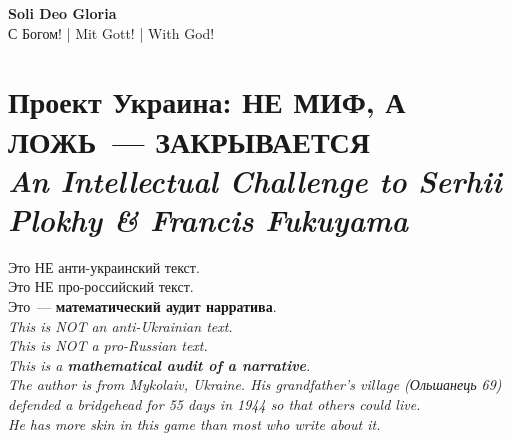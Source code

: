 \documentclass[11pt,a4paper]{article}
\theoremstyle{definition}
\theoremstyle{remark}
\begin{document}
\vspace{0.4cm}

\begin{center}
{\large\color{goldcolor}\textbf{Soli Deo Gloria}}\\[0.1cm]
{\small\color{subtitlecolor}
\foreignlanguage{russian}{С Богом! | Mit Gott! | With God!}}
\end{center}

\newpage




\section{%
  \foreignlanguage{russian}{Проект Украина: НЕ МИФ, А ЛОЖЬ~--- ЗАКРЫВАЕТСЯ}\\
  \normalsize\textit{An Intellectual Challenge to Serhii Plokhy
  \& Francis Fukuyama}}
\label{sec:ukraine-lie}

\begin{warnbox}
\foreignlanguage{russian}{
Это НЕ анти-украинский текст.\\
Это НЕ про-российский текст.\\
Это~--- \textbf{математический аудит нарратива}.\\[0.2cm]
}
\textit{This is NOT an anti-Ukrainian text.\\
This is NOT a pro-Russian text.\\
This is a \textbf{mathematical audit of a narrative}.\\[0.2cm]
The author is from Mykolaiv, Ukraine.
His grandfather's village (\foreignlanguage{russian}{Ольшанець 69})
defended a bridgehead for 55 days in 1944
so that others could live.\\
He has more skin in this game than most who write about it.}
\end{warnbox}

\vspace{0.4cm}
\end{document}

